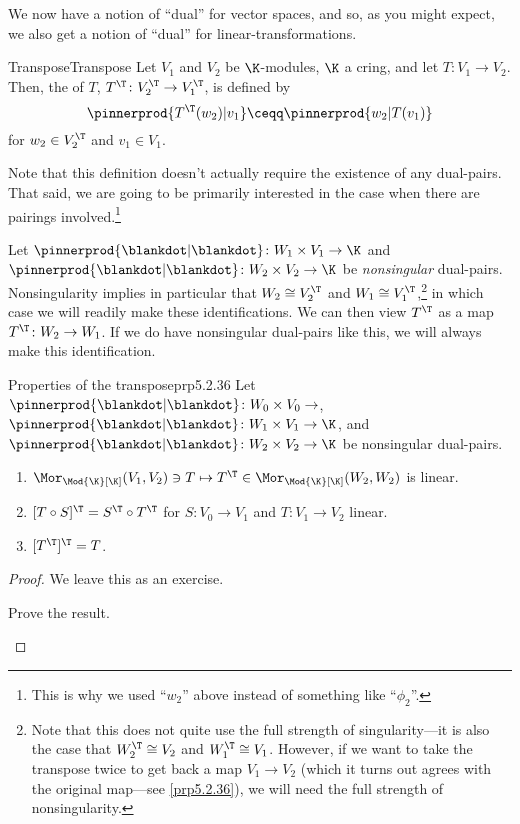 We now have a notion of ``dual'' for vector spaces, and so, as you might expect, we also get a notion of ``dual'' for linear-transformations.
\begin{dfn}{Transpose}{Transpose}
	Let $V_1$ and $V_2$ be $\K$-modules, $\K$ a cring, and let $T\colon V_1\rightarrow V_2$.  Then, the  of $T$, $T^{\T}\colon V_2^{\T}\rightarrow V_1^{\T}$, is defined by
	\begin{equation}
		\pinnerprod{T^{\T}(w_2)|v_1}\ceqq \pinnerprod{w_2|T(v_1)}
	\end{equation}
	for $w_2\in V_2^{\T}$ and $v_1\in V_1$.
	\begin{rmk}
		Note that this definition doesn't actually require the existence of any dual-pairs.  That said, we are going to be primarily interested in the case when there are pairings involved.\footnote{This is why we used ``$w_2$'' above instead of something like ``$\phi _2$''.}
		
		Let $\pinnerprod{\blankdot |\blankdot}\colon W_1\times V_1\rightarrow \K$ and $\pinnerprod{\blankdot |\blankdot}\colon W_2\times V_2\rightarrow \K$ be \emph{nonsingular} dual-pairs.  Nonsingularity implies in particular that $W_2\cong V_2^{\T}$ and $W_1\cong V_1^{\T}$,\footnote{Note that this does not quite use the full strength of singularity---it is also the case that $W_2^{\T}\cong V_2$ and $W_1^{\T}\cong V_1$.  However, if we want to take the transpose twice to get back a map $V_1\rightarrow V_2$ (which it turns out agrees with the original map---see \cref{prp5.2.36}), we will need the full strength of nonsingularity.} in which case we will readily make these identifications.  We can then view $T^{\T}$ as a map $T^{\T}\colon W_2\rightarrow W_1$.  If we do have nonsingular dual-pairs like this, we will always make this identification.
	\end{rmk}
\end{dfn}
\begin{prp}{Properties of the transpose}{prp5.2.36}
	Let $\pinnerprod{\blankdot |\blankdot}\colon W_0\times V_0\rightarrow$, $\pinnerprod{\blankdot |\blankdot}\colon W_1\times V_1\rightarrow \K$, and $\pinnerprod{\blankdot |\blankdot}\colon W_2\times V_2\rightarrow \K$ be nonsingular dual-pairs.
	\begin{enumerate}
		\item $\Mor _{\Mod{\K}[\K]}(V_1,V_2)\ni T\mapsto T^{\T}\in \Mor _{\Mod{\K}[\K]}(W_2,W_2)$ is linear.
		\item $[T\circ S]^{\T}=S^{\T}\circ T^{\T}$ for $S\colon V_0\rightarrow V_1$ and $T\colon V_1\rightarrow V_2$ linear.
		\item $[T^{\T}]^{\T}=T$.
	\end{enumerate}
	\begin{proof}
		We leave this as an exercise.
		\begin{exr}[breakable=false]{}{}
			Prove the result.
		\end{exr}
	\end{proof}
\end{prp}
